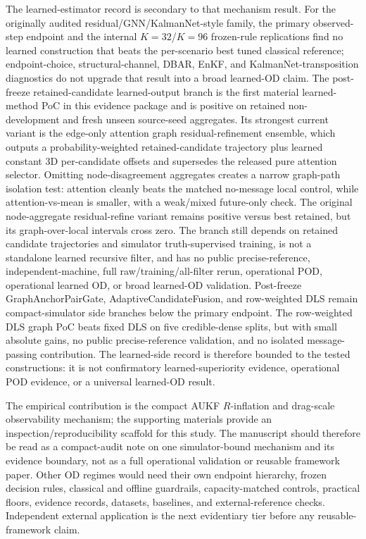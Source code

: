 \documentclass{article}
\begin{document}
The learned-estimator record is secondary to that mechanism result. For the originally audited residual/GNN/KalmanNet-style family, the primary observed-step endpoint and the internal $K=32$/$K=96$ frozen-rule replications find no learned construction that beats the per-scenario best tuned classical reference; endpoint-choice, structural-channel, DBAR, EnKF, and KalmanNet-transposition diagnostics do not upgrade that result into a broad learned-OD claim. The post-freeze retained-candidate learned-output branch is the first material learned-method PoC in this evidence package and is positive on retained non-development and fresh unseen source-seed aggregates. Its strongest current variant is the edge-only attention graph residual-refinement ensemble, which outputs a probability-weighted retained-candidate trajectory plus learned constant 3D per-candidate offsets and supersedes the released pure attention selector. Omitting node-disagreement aggregates creates a narrow graph-path isolation test: attention cleanly beats the matched no-message local control, while attention-vs-mean is smaller, with a weak/mixed future-only check. The original node-aggregate residual-refine variant remains positive versus best retained, but its graph-over-local intervals cross zero. The branch still depends on retained candidate trajectories and simulator truth-supervised training, is not a standalone learned recursive filter, and has no public precise-reference, independent-machine, full raw/training/all-filter rerun, operational POD, operational learned OD, or broad learned-OD validation. Post-freeze GraphAnchorPairGate, AdaptiveCandidateFusion, and row-weighted DLS remain compact-simulator side branches below the primary endpoint. The row-weighted DLS graph PoC beats fixed DLS on five credible-dense splits, but with small absolute gains, no public precise-reference validation, and no isolated message-passing contribution. The learned-side record is therefore bounded to the tested constructions: it is not confirmatory learned-superiority evidence, operational POD evidence, or a universal learned-OD result.

The empirical contribution is the compact AUKF \(R\)-inflation and drag-scale observability mechanism; the supporting materials provide an inspection/reproducibility scaffold for this study. The manuscript should therefore be read as a compact-audit note on one simulator-bound mechanism and its evidence boundary, not as a full operational validation or reusable framework paper. Other OD regimes would need their own endpoint hierarchy, frozen decision rules, classical and offline guardrails, capacity-matched controls, practical floors, evidence records, datasets, baselines, and external-reference checks. Independent external application is the next evidentiary tier before any reusable-framework claim.
\end{document}

